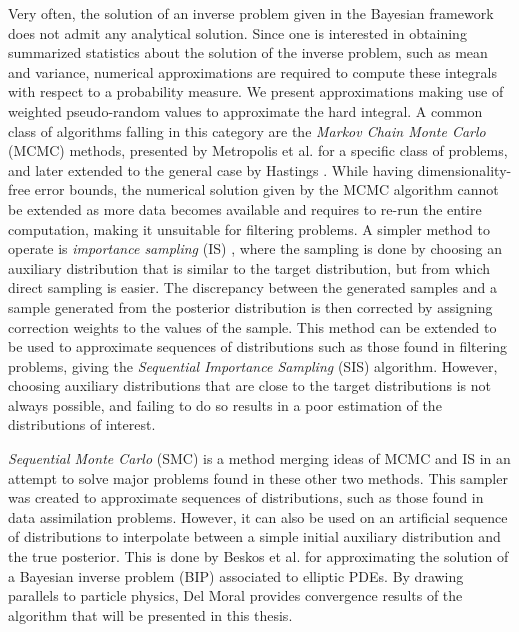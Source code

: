 Very often, the solution of an inverse problem given in the Bayesian framework does not admit any analytical solution. Since one is interested in obtaining summarized statistics about the solution of the inverse problem, such as mean and variance, numerical approximations are required to compute these integrals with respect to a probability measure. We present approximations making use of weighted pseudo-random values to approximate the hard integral. A common class of algorithms falling in this category are the \textit{Markov Chain Monte Carlo} (MCMC) methods, presented by Metropolis et al. \cite{metropolis1953equation} for a specific class of problems, and later extended to the general case by Hastings \cite{hastings1970monte}. While having dimensionality-free error bounds, the numerical solution given by the MCMC algorithm cannot be extended as more data becomes available and requires to re-run the entire computation, making it unsuitable for filtering problems. A simpler method to operate is \textit{importance sampling} (IS) \cite[Chapter 3]{Robert}, where the sampling is done by choosing an auxiliary distribution that is similar to the target distribution, but from which direct sampling is easier. The discrepancy between the generated samples and a sample generated from the posterior distribution is then corrected by assigning correction weights to the values of the sample. This method can be extended to be used to approximate sequences of distributions such as those found in filtering problems, giving the \textit{Sequential Importance Sampling} (SIS) algorithm. However, choosing auxiliary distributions that are close to the target distributions is not always possible, and failing to do so results in a poor estimation of the distributions of interest.

\textit{Sequential Monte Carlo} (SMC) \cite{del_moral_2006} is a method merging ideas of MCMC and IS in an attempt to solve major problems found in these other two methods. This sampler was created to approximate sequences of distributions, such as those found in data assimilation problems. However, it can also be used on an artificial sequence of distributions to interpolate between a simple initial auxiliary distribution and the true posterior. This is done by Beskos et al. \cite{beskos2015sequential} for approximating the solution of a Bayesian inverse problem (BIP) associated to elliptic PDEs. By drawing parallels to particle physics, Del Moral \cite{del2013mean, del2004feynman} provides convergence results of the algorithm that will be presented in this thesis.

